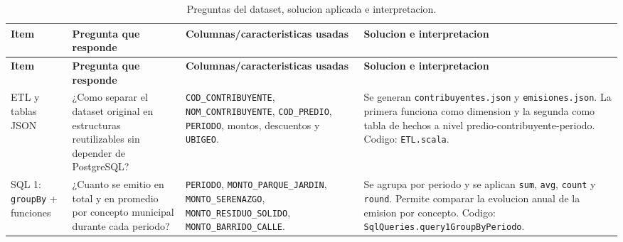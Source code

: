 \setlength{\emergencystretch}{3em}
\begin{longtable}{
  p{}
  p{}
  p{}
  p{}
}
\caption{Preguntas del dataset, solucion aplicada e interpretacion.}

\label{tab:preguntas-consultas}\\

\toprule

\textbf{Item} & \textbf{Pregunta que responde} & \textbf{Columnas/\newline caracteristicas usadas} & \textbf{Solucion e \newline interpretacion} \\

\midrule

\endfirsthead

\toprule

\textbf{Item} & \textbf{Pregunta que responde} & \textbf{Columnas/\newline caracteristicas usadas} & \textbf{Solucion e \newline interpretacion} \\

\midrule

\endhead

ETL y tablas JSON &

¿Como separar el dataset original en estructuras reutilizables sin depender de PostgreSQL? &

\texttt{COD\_CONTRIBUYENTE}, \texttt{NOM\_CONTRIBUYENTE}, \texttt{COD\_PREDIO}, \texttt{PERIODO}, montos, descuentos y \texttt{UBIGEO}. &

Se generan \texttt{contribuyentes.json} y \texttt{emisiones.json}. La primera funciona como dimension y la segunda como tabla de hechos a nivel predio-contribuyente-periodo. Codigo: \texttt{ETL.scala}. \\

\midrule

SQL 1: \texttt{groupBy} + funciones &

¿Cuanto se emitio en total y en promedio por concepto municipal durante cada periodo? &

\texttt{PERIODO}, \texttt{MONTO\_PARQUE\_JARDIN}, \texttt{MONTO\_SERENAZGO}, \texttt{MONTO\_RESIDUO\_SOLIDO}, \texttt{MONTO\_BARRIDO\_CALLE}. &

Se agrupa por periodo y se aplican \texttt{sum}, \texttt{avg}, \texttt{count} y \texttt{round}. Permite comparar la evolucion anual de la emision por concepto. Codigo: \texttt{SqlQueries.query1GroupByPeriodo}. \\


\end{longtable}

